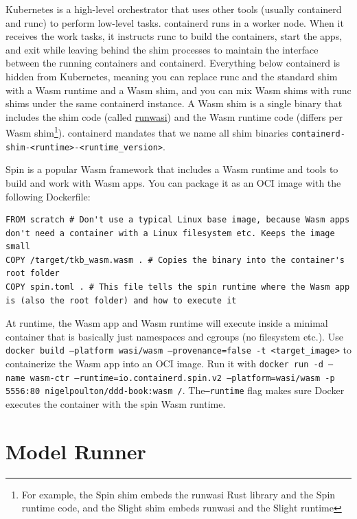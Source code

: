\documentclass[table, xcdraw]{article}%
\begin{document}
Kubernetes is a high-level orchestrator that uses other tools (usually containerd  and runc) to perform low-level tasks. containerd runs in a worker node. When it receives the work tasks, it instructs runc to build the containers, start the apps, and exit while leaving behind the shim processes to maintain the interface between the running containers and containerd. Everything below containerd is hidden from Kubernetes, meaning you can replace runc and the standard shim with a Wasm runtime and a Wasm shim, and you can mix Wasm shims with runc shims under the same containerd instance. A Wasm shim is a single binary that includes the shim code (called \href{https://github.com/containerd/runwasi}{runwasi}) and the Wasm runtime code (differs per Wasm shim\footnote{For example, the Spin shim embeds the runwasi Rust library and the Spin runtime code, and the Slight shim embeds runwasi and the Slight runtime}). containerd mandates that we name all shim binaries \texttt{containerd-shim-<runtime>-<runtime_version>}.

Spin is a popular Wasm framework that includes a Wasm runtime and tools to build and work with Wasm apps. You can package it as an OCI image with the following Dockerfile:

\begin{verbatim}
FROM scratch # Don't use a typical Linux base image, because Wasm apps don't need a container with a Linux filesystem etc. Keeps the image small
COPY /target/tkb_wasm.wasm . # Copies the binary into the container's root folder
COPY spin.toml . # This file tells the spin runtime where the Wasm app is (also the root folder) and how to execute it
\end{verbatim}

At runtime, the Wasm app and Wasm runtime will execute inside a minimal container that is basically just namespaces and cgroups (no filesystem etc.). Use \texttt{docker build --platform wasi/wasm --provenance=false -t <target_image>} to containerize the Wasm app into an OCI image. Run it with \texttt{docker run -d --name wasm-ctr --runtime=io.containerd.spin.v2 --platform=wasi/wasm -p 5556:80 nigelpoulton/ddd-book:wasm /}. The\texttt{--runtime} flag makes sure Docker executes the container with the spin Wasm runtime.

\section{Model Runner}
\end{document}
